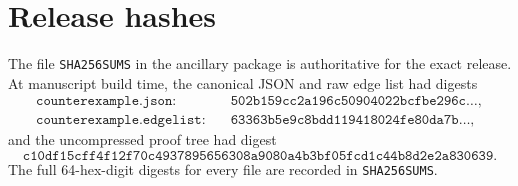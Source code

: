 \documentclass[11pt]{article}
\theoremstyle{definition}
\theoremstyle{remark}
\begin{document}
\section{Release hashes}\label{app:hashes}
The file \texttt{SHA256SUMS} in the ancillary package is authoritative for the exact release.  At manuscript build time, the canonical JSON and raw edge list had digests
\begin{align*}
\texttt{counterexample.json}:\quad&\texttt{502b159cc2a196c50904022bcfbe296c}\ldots,\\
\texttt{counterexample.edgelist}:\quad&\texttt{63363b5e9c8bdd119418024fe80da7b}\ldots,
\end{align*}
and the uncompressed proof tree had digest
\[
\texttt{c10df15cff4f12f70c4937895656308a9080a4b3bf05fcd1c44b8d2e2a830639}.
\]
The full 64-hex-digit digests for every file are recorded in \texttt{SHA256SUMS}.
\end{document}
